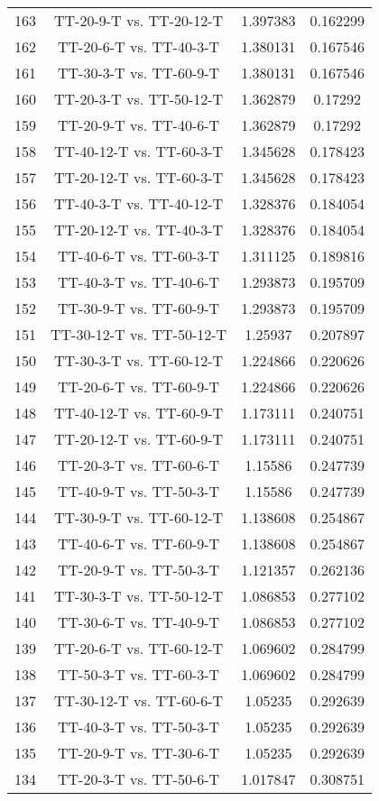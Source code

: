 \documentclass[a4paper,10pt]{article}
\begin{document}
\begin{landscape}
\begin{table}[!htp]
\begin{tabular}{cccc}
163&TT-20-9-T vs. TT-20-12-T&1.397383&0.162299\\
162&TT-20-6-T vs. TT-40-3-T&1.380131&0.167546\\
161&TT-30-3-T vs. TT-60-9-T&1.380131&0.167546\\
160&TT-20-3-T vs. TT-50-12-T&1.362879&0.17292\\
159&TT-20-9-T vs. TT-40-6-T&1.362879&0.17292\\
158&TT-40-12-T vs. TT-60-3-T&1.345628&0.178423\\
157&TT-20-12-T vs. TT-60-3-T&1.345628&0.178423\\
156&TT-40-3-T vs. TT-40-12-T&1.328376&0.184054\\
155&TT-20-12-T vs. TT-40-3-T&1.328376&0.184054\\
154&TT-40-6-T vs. TT-60-3-T&1.311125&0.189816\\
153&TT-40-3-T vs. TT-40-6-T&1.293873&0.195709\\
152&TT-30-9-T vs. TT-60-9-T&1.293873&0.195709\\
151&TT-30-12-T vs. TT-50-12-T&1.25937&0.207897\\
150&TT-30-3-T vs. TT-60-12-T&1.224866&0.220626\\
149&TT-20-6-T vs. TT-60-9-T&1.224866&0.220626\\
148&TT-40-12-T vs. TT-60-9-T&1.173111&0.240751\\
147&TT-20-12-T vs. TT-60-9-T&1.173111&0.240751\\
146&TT-20-3-T vs. TT-60-6-T&1.15586&0.247739\\
145&TT-40-9-T vs. TT-50-3-T&1.15586&0.247739\\
144&TT-30-9-T vs. TT-60-12-T&1.138608&0.254867\\
143&TT-40-6-T vs. TT-60-9-T&1.138608&0.254867\\
142&TT-20-9-T vs. TT-50-3-T&1.121357&0.262136\\
141&TT-30-3-T vs. TT-50-12-T&1.086853&0.277102\\
140&TT-30-6-T vs. TT-40-9-T&1.086853&0.277102\\
139&TT-20-6-T vs. TT-60-12-T&1.069602&0.284799\\
138&TT-50-3-T vs. TT-60-3-T&1.069602&0.284799\\
137&TT-30-12-T vs. TT-60-6-T&1.05235&0.292639\\
136&TT-40-3-T vs. TT-50-3-T&1.05235&0.292639\\
135&TT-20-9-T vs. TT-30-6-T&1.05235&0.292639\\
134&TT-20-3-T vs. TT-50-6-T&1.017847&0.308751\\

\end{tabular}
\end{table}
\end{landscape}
\end{document}
